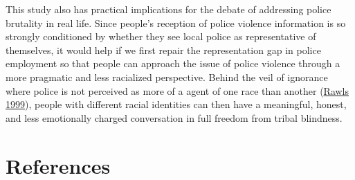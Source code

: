 \documentclass[
  12pt,
]{article}
\begin{document}
This study also has practical implications for the debate of addressing
police brutality in real life. Since people's reception of police
violence information is so strongly conditioned by whether they see
local police as representative of themselves, it would help if we first
repair the representation gap in police employment so that people can
approach the issue of police violence through a more pragmatic and less
racialized perspective. Behind the veil of ignorance where police is not
perceived as more of a agent of one race than another
(\protect\hyperlink{ref-rawls1999}{Rawls 1999}), people with different
racial identities can then have a meaningful, honest, and less
emotionally charged conversation in full freedom from tribal blindness.

\hypertarget{references}{%
\section{References}\label{references}}

\small
\end{document}
